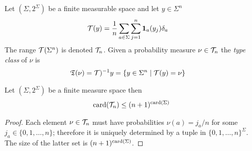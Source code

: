 \begin{defn}Let $(\Sigma, 2^\Sigma)$ be a finite measurable space and let $y \in \Sigma^n$
\begin{align*}
\mathcal{T}(y) &= \frac{1}{n} \sum_{a \in \Sigma} \sum_{j=1}^n \textbf{1}_{a}(y_j) \delta_a
\end{align*}
The range $\mathcal{T}(\Sigma^n)$ is denoted $\mathcal{T}_{n}$.  Given a probability measure $\nu \in \mathcal{T}_{n}$ the
\emph{type class} of $\nu$ is 
\begin{align*}
\mathfrak{T}(\nu) &= \mathcal{T})^{-1} y = \lbrace y \in \Sigma^n \mid \mathcal{T}(y) = \nu \rbrace
\end{align*}
\end{defn}

\begin{lem}\label{SizeOfAType}Let $(\Sigma, 2^{\Sigma})$ be a finite measure space then 
\begin{align*}
\operatorname*{card}(\mathcal{T}_{n}) \leq (n+1)^{\operatorname*{card}(\Sigma)}
\end{align*}
\end{lem}
\begin{proof}
Each element $\nu \in \mathcal{T}_{n}$ must have probabilities $\nu(a) = j_a/n$ for some $j_a \in \lbrace 0,1, \dotsc, n \rbrace$; therefore 
it is uniquely determined by a tuple in $\lbrace 0, 1, \dotsc, n \rbrace^\Sigma$.  The size of the latter set is $(n+1)^{\operatorname*{card}(\Sigma)}$.
\end{proof}

